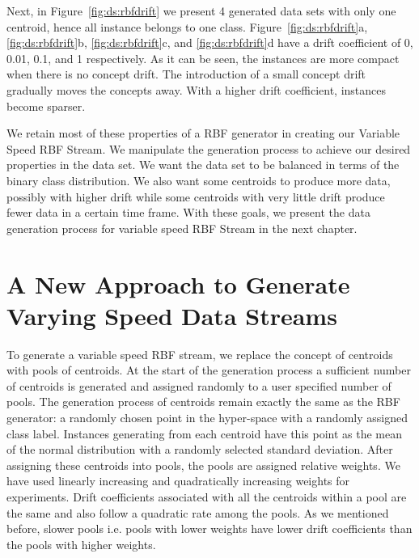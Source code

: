 Next, in Figure~\ref{fig:ds:rbfdrift} we present 4 generated data sets with only one centroid, hence all instance belongs to one class. Figure~\ref{fig:ds:rbfdrift}a, \ref{fig:ds:rbfdrift}b, \ref{fig:ds:rbfdrift}c, and \ref{fig:ds:rbfdrift}d have a drift coefficient of 0, 0.01, 0.1, and 1 respectively. As it can be seen, the instances are more compact when there is no concept drift. The introduction of a small concept drift gradually moves the concepts away. With a higher drift coefficient, instances become sparser.

We retain most of these properties of a RBF generator in creating our Variable Speed RBF Stream. We manipulate the generation process to achieve our desired properties in the data set. We want the data set to be balanced in terms of the binary class distribution. We also want some centroids to produce more data, possibly with higher drift while some centroids with very little drift produce fewer data in a certain time frame. With these goals, we present the data generation process for variable speed RBF Stream in the next chapter.

\section{A New Approach to Generate Varying Speed Data Streams}
To generate a variable speed RBF stream, we replace the concept of centroids with pools of centroids. At the start of the generation process a sufficient number of centroids is generated and assigned randomly to a user specified number of pools. The generation process of centroids remain exactly the same as the RBF generator: a randomly chosen point in the hyper-space with a randomly assigned class label. Instances generating from each centroid have this point as the mean of the normal distribution with a randomly selected standard deviation. After assigning these centroids into pools, the pools are assigned relative weights. We have used linearly increasing and quadratically increasing weights for experiments. Drift coefficients associated with all the centroids within a pool are the same and also follow  a quadratic rate among the pools. As we mentioned before, slower pools i.e. pools with lower weights have lower drift coefficients than the pools with higher weights.

